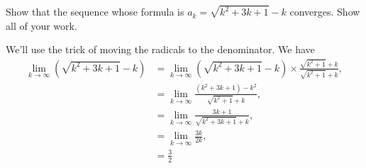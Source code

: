 \documentclass[12pt,fleqn,answers]{exam}
\begin{document}
\begin{questions}
    




  \question  Show that the sequence whose formula is 
  $a_k = \sqrt{k^2+ 3 k + 1} - k$ converges. Show all of your work.
  \begin{solution}%
  We'll use the trick of moving the radicals to the denominator. We have
  \begin{align*}
  \lim_{k \to \infty} \left(\sqrt{k^2+3k+1} - k \right)  &= \lim_{k \to \infty} \left(\sqrt{k^2+3 k + 1} - k \right)   \times \frac{\sqrt{k^2+1}  + k}{\sqrt{k^2+1}  + k}, \\
                                                                 &= \lim_{k \to \infty} \frac{(k^2+3k+1) - k^2}{\sqrt{k^2+1}  + k}, \\
                                                                 &=  \lim_{k \to \infty} \frac{3k + 1}{\sqrt{k^2+3k + 1}  + k}, \\
                                                                 &= \lim_{k \to \infty} \frac{3k}{2k}, \\
                                                                 &=  \frac{3}{2}
  \end{align*}
    \end{solution}


\end{questions}
\end{document}
